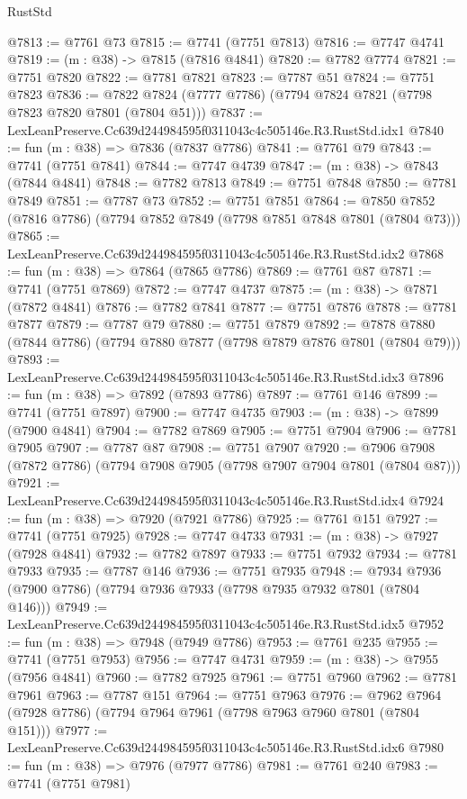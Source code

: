 \begin{lexlean}{RustStd}
\begin{coremodule}
@7813 := @7761 @73
@7815 := @7741 (@7751 @7813)
@7816 := @7747 @4741
@7819 := (m : @38) -> @7815 (@7816 @4841)
@7820 := @7782 @7774
@7821 := @7751 @7820
@7822 := @7781 @7821
@7823 := @7787 @51
@7824 := @7751 @7823
@7836 := @7822 @7824 (@7777 @7786) (@7794 @7824 @7821 (@7798 @7823 @7820 @7801 (@7804 @51)))
@7837 := LexLeanPreserve.Cc639d244984595f0311043c4c505146e.R3.RustStd.idx1
@7840 := fun (m : @38) => @7836 (@7837 @7786)
@7841 := @7761 @79
@7843 := @7741 (@7751 @7841)
@7844 := @7747 @4739
@7847 := (m : @38) -> @7843 (@7844 @4841)
@7848 := @7782 @7813
@7849 := @7751 @7848
@7850 := @7781 @7849
@7851 := @7787 @73
@7852 := @7751 @7851
@7864 := @7850 @7852 (@7816 @7786) (@7794 @7852 @7849 (@7798 @7851 @7848 @7801 (@7804 @73)))
@7865 := LexLeanPreserve.Cc639d244984595f0311043c4c505146e.R3.RustStd.idx2
@7868 := fun (m : @38) => @7864 (@7865 @7786)
@7869 := @7761 @87
@7871 := @7741 (@7751 @7869)
@7872 := @7747 @4737
@7875 := (m : @38) -> @7871 (@7872 @4841)
@7876 := @7782 @7841
@7877 := @7751 @7876
@7878 := @7781 @7877
@7879 := @7787 @79
@7880 := @7751 @7879
@7892 := @7878 @7880 (@7844 @7786) (@7794 @7880 @7877 (@7798 @7879 @7876 @7801 (@7804 @79)))
@7893 := LexLeanPreserve.Cc639d244984595f0311043c4c505146e.R3.RustStd.idx3
@7896 := fun (m : @38) => @7892 (@7893 @7786)
@7897 := @7761 @146
@7899 := @7741 (@7751 @7897)
@7900 := @7747 @4735
@7903 := (m : @38) -> @7899 (@7900 @4841)
@7904 := @7782 @7869
@7905 := @7751 @7904
@7906 := @7781 @7905
@7907 := @7787 @87
@7908 := @7751 @7907
@7920 := @7906 @7908 (@7872 @7786) (@7794 @7908 @7905 (@7798 @7907 @7904 @7801 (@7804 @87)))
@7921 := LexLeanPreserve.Cc639d244984595f0311043c4c505146e.R3.RustStd.idx4
@7924 := fun (m : @38) => @7920 (@7921 @7786)
@7925 := @7761 @151
@7927 := @7741 (@7751 @7925)
@7928 := @7747 @4733
@7931 := (m : @38) -> @7927 (@7928 @4841)
@7932 := @7782 @7897
@7933 := @7751 @7932
@7934 := @7781 @7933
@7935 := @7787 @146
@7936 := @7751 @7935
@7948 := @7934 @7936 (@7900 @7786) (@7794 @7936 @7933 (@7798 @7935 @7932 @7801 (@7804 @146)))
@7949 := LexLeanPreserve.Cc639d244984595f0311043c4c505146e.R3.RustStd.idx5
@7952 := fun (m : @38) => @7948 (@7949 @7786)
@7953 := @7761 @235
@7955 := @7741 (@7751 @7953)
@7956 := @7747 @4731
@7959 := (m : @38) -> @7955 (@7956 @4841)
@7960 := @7782 @7925
@7961 := @7751 @7960
@7962 := @7781 @7961
@7963 := @7787 @151
@7964 := @7751 @7963
@7976 := @7962 @7964 (@7928 @7786) (@7794 @7964 @7961 (@7798 @7963 @7960 @7801 (@7804 @151)))
@7977 := LexLeanPreserve.Cc639d244984595f0311043c4c505146e.R3.RustStd.idx6
@7980 := fun (m : @38) => @7976 (@7977 @7786)
@7981 := @7761 @240
@7983 := @7741 (@7751 @7981)

\end{coremodule}
\end{lexlean}
